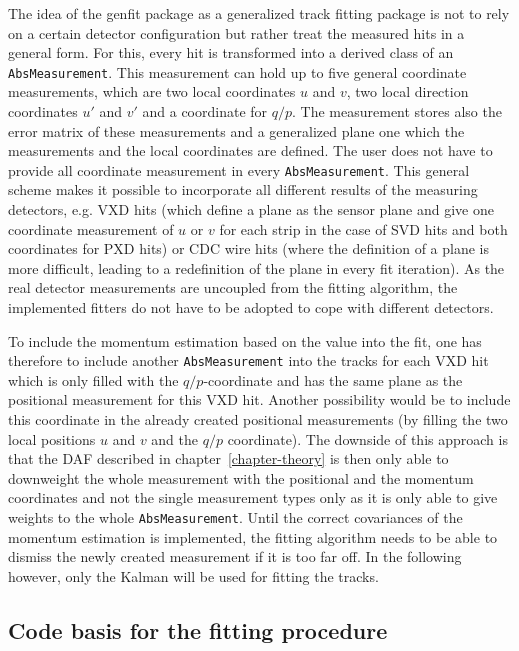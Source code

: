 The idea of the genfit package as a generalized track fitting package is not to rely on a certain detector configuration but rather treat the measured hits in a general form. For this, every hit is transformed into a derived class of an \texttt{AbsMeasurement}. This measurement can hold up to five general coordinate measurements, which are two local coordinates $u$ and $v$, two local direction coordinates $u'$ and $v'$ and a coordinate for $q/p$. The measurement stores also the error matrix of these measurements and a generalized plane one which the measurements and the local coordinates are defined. The user does not have to provide all coordinate measurement in every \texttt{AbsMeasurement}. This general scheme makes it possible to incorporate all different results of the measuring detectors, e.g. VXD hits (which define a plane as the sensor plane and give one coordinate measurement of $u$ or $v$ for each strip in the case of SVD hits and both coordinates for PXD hits) or CDC wire hits (where the definition of a plane is more difficult, leading to a redefinition of the plane in every fit iteration). As the real detector measurements are uncoupled from the fitting algorithm, the implemented fitters do not have to be adopted to cope with different detectors.

To include the momentum estimation based on the \dedx value into the fit, one has therefore to include another \texttt{AbsMeasurement} into the tracks for each VXD hit which is only filled with the $q/p$-coordinate and has the same plane as the positional measurement for this VXD hit. Another possibility would be to include this coordinate in the already created positional measurements (by filling the two local positions $u$ and $v$ and the $q/p$ coordinate). The downside of this approach is that the DAF described in chapter~\ref{chapter-theory} is then only able to downweight the whole measurement with the positional and the momentum coordinates and not the single measurement types only as it is only able to give weights to the whole \texttt{AbsMeasurement}. Until the correct covariances of the momentum estimation is implemented, the fitting algorithm needs to be able to dismiss the newly created measurement if it is too far off. In the following however, only the Kalman will be used for fitting the tracks.

\subsection{Code basis for the fitting procedure}


